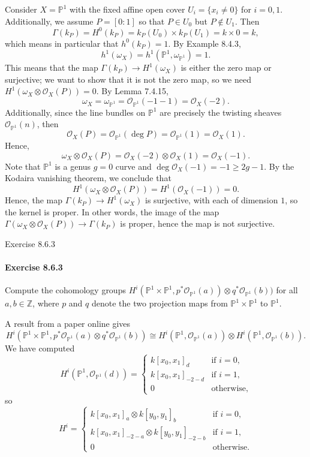 \documentclass[12pt]{article}
\newlength{\myparskip}
\newenvironment{fullbox}{\begin{lrbox}{\savefullbox}\begin{minipage}{\dimexpr\textwidth-2\fboxsep\relax}\setlength{\parskip}{\myparskip}}{\end{minipage}\end{lrbox}\framebox[\textwidth]{\usebox{\savefullbox}}}
\newenvironment{pbox}[1][]{\begin{fullbox}\ifx#1\empty\else\paragraph{#1}\phantom{}\fi}{\end{fullbox}}
\theoremstyle{definition}
\newcommand{\Z}{\mathbb{Z}}
\renewcommand{\P}{\mathbb{P}}
\newcommand{\<}{\langle}
\renewcommand{\>}{\rangle}
\newcommand{\isom}{\cong}
\newcommand{\OO}{\mathcal{O}}
\newcommand{\tensor}{\otimes}
\begin{document}
Consider $X = \P^1$ with the fixed affine open cover $U_i = \{x_i \ne 0\}$ for $i = 0, 1$.
Additionally, we assume $P = [0 : 1]$ so that $P \in U_0$ but $P \notin U_1$.
Then
\[
    \Gamma(k_P)
        = H^0(k_P)
        = k_P(U_0) \times k_P(U_1)
        = k \times 0
        = k,
\]
which means in particular that $h^0(k_P) = 1$.
By Example 8.4.3,
\[
    h^1(\omega_X) = h^1(\P^1, \omega_{\P^1}) = 1.
\]
This means that the map $\Gamma(k_P) \to H^1(\omega_X)$ is either the zero map or surjective; we want to show that it is not the zero map, so we need $H^1(\omega_X \tensor \OO_X(P)) = 0$.
By Lemma 7.4.15,
\[
    \omega_X = \omega_{\P^1} = \OO_{\P^1}(-1-1) = \OO_X(-2).
\]
Additionally, since the line bundles on $\P^1$ are precisely the twisting sheaves $\OO_{\P^1}(n)$, then
\[
    \OO_X(P) = \OO_{\P^1}(\deg P) = \OO_{\P^1}(1) = \OO_X(1).
\]
Hence,
\[
    \omega_X \tensor \OO_X(P) = \OO_X(-2) \tensor \OO_X(1) = \OO_X(-1).
\]
Note that $\P^1$ is a genus $g = 0$ curve and $\deg \OO_X(-1) = -1 \geq 2g - 1$.
By the Kodaira vanishing theorem, we conclude that
\[
    H^1(\omega_X \tensor \OO_X(P)) = H^1(\OO_X(-1)) = 0.
\]
Hence, the map $\Gamma(k_P) \to H^1(\omega_X)$ is surjective, with each of dimension $1$, so the kernel is proper.
In other words, the image of the map $\Gamma(\omega_X \tensor \OO_X(P)) \to \Gamma(k_P)$ is proper, hence the map is not surjective.




\newpage
\begin{pbox}[Exercise 8.6.3]
    Compute the cohomology groups $H^i(\P^1 \times \P^1, p^*\OO_{\P^1}(a)) \tensor q^*\OO_{\P^1}(b))$ for all $a, b \in \Z$, where $p$ and $q$ denote the two projection maps from $\P^1 \times \P^1$ to $\P^1$.
\end{pbox}

A result from a paper online gives
\[
    H^i(\P^1 \times \P^1, p^*\OO_{\P^1}(a) \tensor q^*\OO_{\P^1}(b))
        \isom H^i(\P^1, \OO_{\P^1}(a)) \tensor H^i(\P^1, \OO_{\P^1}(b)).
\]
We have computed
\[
    H^i(\P^1, \OO_{\P^1}(d)) = \begin{cases}
        k[x_0, x_1]_d &\text{if } i = 0, \\
        k[x_0, x_1]_{-2-d} &\text{if } i = 1, \\
        0 &\text{otherwise},
    \end{cases}
\]
so
\[
    H^i = \begin{cases}
        k[x_0, x_1]_a \tensor k[y_0, y_1]_b &\text{if } i = 0, \\
        k[x_0, x_1]_{-2-a} \tensor k[y_0, y_1]_{-2-b} &\text{if } i = 1, \\
        0 &\text{otherwise}.
    \end{cases}
\]
\end{document}
